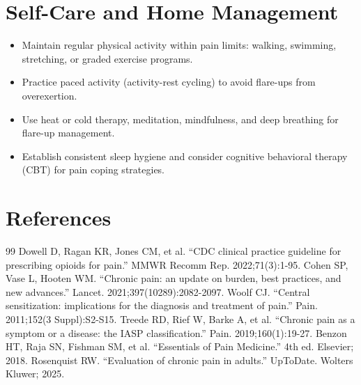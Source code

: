 \section*{Self-Care and Home Management}
\begin{itemize}
  \item Maintain regular physical activity within pain limits: walking, swimming, stretching, or graded exercise programs.
  \item Practice paced activity (activity-rest cycling) to avoid flare-ups from overexertion.
  \item Use heat or cold therapy, meditation, mindfulness, and deep breathing for flare-up management.
  \item Establish consistent sleep hygiene and consider cognitive behavioral therapy (CBT) for pain coping strategies.
\end{itemize}

\section*{References}
\begin{thebibliography}{99}
 Dowell D, Ragan KR, Jones CM, et al. ``CDC clinical practice guideline for prescribing opioids for pain.'' MMWR Recomm Rep. 2022;71(3):1-95.
 Cohen SP, Vase L, Hooten WM. ``Chronic pain: an update on burden, best practices, and new advances.'' Lancet. 2021;397(10289):2082-2097.
 Woolf CJ. ``Central sensitization: implications for the diagnosis and treatment of pain.'' Pain. 2011;152(3 Suppl):S2-S15.
 Treede RD, Rief W, Barke A, et al. ``Chronic pain as a symptom or a disease: the IASP classification.'' Pain. 2019;160(1):19-27.
 Benzon HT, Raja SN, Fishman SM, et al. ``Essentials of Pain Medicine.'' 4th ed. Elsevier; 2018.
 Rosenquist RW. ``Evaluation of chronic pain in adults.'' UpToDate. Wolters Kluwer; 2025.
\end{thebibliography}

